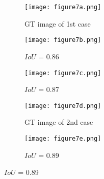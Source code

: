 \begin{figure} [!h]
	\centering
	\begin{subfigure}[b]{0.32\textwidth}
		\centering
		\DIFdelbeginFL %
\DIFdelendFL \DIFaddbeginFL \texttt{[image: figure7a.png]}
		\DIFaddendFL \caption{GT image of 1st case}
		\label{fig:num_GT_391}
	\end{subfigure}
	\hfill
	\begin{subfigure}[b]{0.32\textwidth}
		\centering
		\DIFdelbeginFL %
\DIFdelendFL \DIFaddbeginFL \texttt{[image: figure7b.png]} 
		\DIFaddendFL \caption{\(IoU\) \DIFdelbeginFL {}\DIFdelendFL = 0.86}
		\label{fig:Convlstm_num_391}
	\end{subfigure}
	\hfill
	\begin{subfigure}[b]{0.32\textwidth}
		\centering
		\DIFdelbeginFL %
\DIFdelendFL \DIFaddbeginFL \texttt{[image: figure7c.png]}
		\DIFaddendFL \caption{\(IoU\) \DIFdelbeginFL {}\DIFdelendFL =  0.87}
		\label{fig:AE_num_391}
	\end{subfigure}
	\par\medskip
	\begin{subfigure}[b]{0.32\textwidth}
		\centering
		\DIFdelbeginFL %
\DIFdelendFL \DIFaddbeginFL \texttt{[image: figure7d.png]}
		\DIFaddendFL \caption{GT image of 2nd case}
		\label{fig:num_GT_462}
	\end{subfigure}
	\hfill
	\begin{subfigure}[b]{0.32\textwidth}
		\centering
		\DIFdelbeginFL %
\DIFdelendFL \DIFaddbeginFL \texttt{[image: figure7e.png]}
		\DIFaddendFL \caption{\(IoU\) \DIFdelbeginFL {}\DIFdelendFL = 0.89}

\end{subfigure}
\end{figure}
